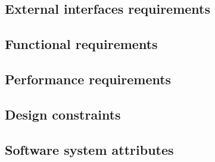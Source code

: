 \documentclass[../main.tex]{subfiles}
\begin{document}
\subsection{External interfaces requirements}
\subsection{Functional requirements}
\subsection{Performance requirements}
\subsection{Design constraints}
\subsection{Software system attributes}
\end{document}
